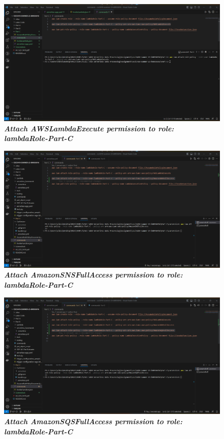      \begin{figure}[htp]
        \centering
        \includegraphics[scale=1, width=15cm]{PROBLEM 3/Screenshots/1.3 attach AWSLambdaExecute permission to role.png}
        \caption{\textbf{\textit{Attach AWSLambdaExecute permission to role: lambdaRole-Part-C}}}
        \label{fig:}
    \end{figure}

     \begin{figure}[htp]
        \centering
        \includegraphics[scale=1, width=15cm]{PROBLEM 3/Screenshots/1.3.1 attach AmazonSNSFullAccess permission to role.png}
        \caption{\textbf{\textit{Attach AmazonSNSFullAccess permission to role: lambdaRole-Part-C}}}
        \label{fig:}
    \end{figure}


    \begin{figure}[htp]
        \centering
        \includegraphics[scale=1, width=15cm]{PROBLEM 3/Screenshots/1.3.2 attach AmazonSQSFullAccess permission to role.png}
        \caption{\textbf{\textit{Attach AmazonSQSFullAccess permission to role: lambdaRole-Part-C}}}
        \label{fig:}
    \end{figure}

